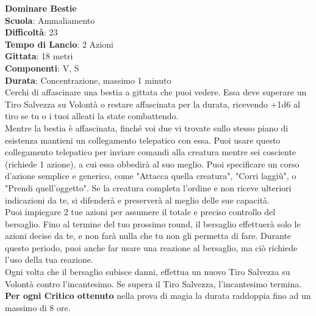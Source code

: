 \begin{multicols}{2}
\medskip\textbf{Dominare Bestie}\\
\textbf{Scuola}: Ammaliamento\\
\textbf{Difficoltà}: 23\\
\textbf{Tempo di Lancio}: 2 Azioni\\
\textbf{Gittata}: 18 metri\\
\textbf{Componenti}: V, S\\
\textbf{Durata}: Concentrazione, massimo 1 minuto\\
Cerchi di affascinare una bestia a gittata che puoi vedere. Essa deve superare un Tiro Salvezza su Volontà o restare affascinata per la durata, ricevendo +1d6 al tiro se tu o i tuoi alleati la state combattendo.\\
Mentre la bestia è affascinata, finché voi due vi trovate sullo stesso piano di esistenza mantieni un collegamento telepatico con essa. Puoi usare questo collegamento telepatico per inviare comandi alla creatura mentre sei cosciente (richiede 1 azione), a cui essa obbedirà al suo meglio. Puoi specificare un corso d'azione semplice e generico, come "Attacca quella creatura", "Corri laggiù", o "Prendi quell'oggetto". Se la creatura completa l'ordine e non riceve ulteriori indicazioni da te, si difenderà e preserverà al meglio delle sue capacità.\\
Puoi impiegare 2 tue azioni per assumere il totale e preciso controllo del bersaglio. Fino al termine del tuo prossimo round, il bersaglio effettuerà solo le azioni decise da te, e non farà nulla che tu non gli permetta di fare. Durante questo periodo, puoi anche far usare una reazione al bersaglio, ma ciò richiede l'uso della tua reazione.\\
Ogni volta che il bersaglio subisce danni, effettua un nuovo Tiro Salvezza su Volontà contro l'incantesimo. Se supera il Tiro Salvezza, l'incantesimo termina.\\
\textbf{Per ogni Critico ottenuto} nella prova di magia la durata raddoppia fino ad un massimo di 8 ore.


\end{multicols}
